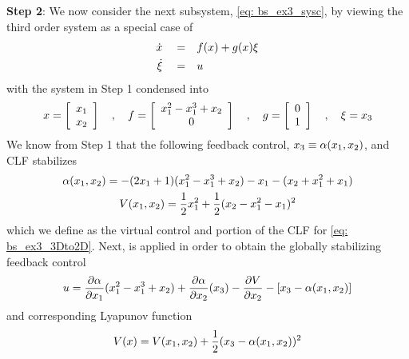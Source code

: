 \documentclass[12pt]{ucthesis}
\begin{document}
\begin{eg}
	\noindent \textbf{Step 2}: We now consider the next subsystem, \ref{eq: bs_ex3_sysc}, by viewing the third order system as a special case of 
		\begin{align*} 
			\dot{x} 	\quad =& \quad f(x)+g(x)\xi \\
			\dot{\xi} \quad =& \quad u
		\end{align*}
	with the system in Step 1 condensed into
		\begin{equation} \label{eq: bs_ex3_3Dto2D}
			x = \left[ \begin{array}{c} x_1 \\ x_2 \end{array} \right] \quad,\quad f= \left[ \begin{array}{c} x_1^2-x_1^3+x_2 \\ 0 \end{array} \right] \quad,\quad g = \left[ \begin{array}{c} 0 \\ 1 \end{array}\right] \quad,\quad \xi=x_3 
		\end{equation}
	We know from Step 1 that the following feedback control, $x_3 \equiv \alpha(x_1,x_2)$, and CLF stabilizes  
		\begin{gather*} 
			\alpha(x_1,x_2) 	=  -(2x_1 + 1)(x_1^2 - x_1^3 + x_2) - x_1 - (x_2 + x_1^2 + x_1) \\
			V(x_1,x_2)    	= \frac{1}{2}x_1^2 + \frac{1}{2}(x_2  -x_1^2 - x_1)^2
		\end{gather*} \label{eq: bs_ex3_stab2}
	which we define as the virtual control and portion of the CLF for \ref{eq: bs_ex3_3Dto2D}. Next,  is applied in order to obtain the globally stabilizing feedback control
		\begin{equation} \label{eq: bs_ex3_step4a}
			u = \frac{\partial\alpha}{\partial x_1}(x_1^2 - x_1^3 + x_2) + \frac{\partial\alpha}{\partial x_2}(x_3) - \frac{\partial V}{\partial x_2} - [x_3 - \alpha(x_1,x_2)] 
		\end{equation}		
	and corresponding Lyapunov function
		\begin{equation} \label{eq: bs_ex3_step4b}
			V(x) = V(x_1,x_2) + \frac{1}{2}(x_3  -\alpha(x_1,x_2))^2
		\end{equation}	
\end{eg}
\end{document}
